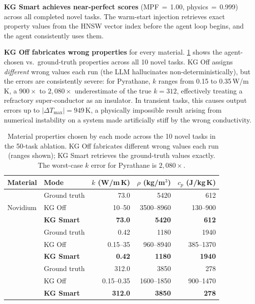 \documentclass[twocolumn]{article}
\begin{document}
\textbf{KG Smart achieves near-perfect scores} (MPF$\,{=}\,$1.00,
physics$\,{=}\,$0.999) across all completed novel tasks.  The warm-start
injection retrieves exact property values from the HNSW vector index
before the agent loop begins, and the agent consistently uses them.

\textbf{KG Off fabricates wrong properties} for every material.
\cref{tab:novel-props} shows the agent-chosen vs.\ ground-truth
properties across all 10 novel tasks.  KG Off assigns \emph{different}
wrong values each run (the LLM hallucinates non-deterministically), but
the errors are consistently severe: for Pyrathane, $k$ ranges from
0.15 to 0.35\,W/m\,K, a $900{\times}$ to $2{,}080{\times}$ underestimate
of the true $k{=}312$, effectively treating a refractory super-conductor
as an insulator.  In transient tasks, this causes output errors up to
$|\Delta T_{\max}|{=}949$\,K, a physically impossible result arising
from numerical instability on a system made artificially stiff by the
wrong conductivity.

\begin{table}[htbp]
\centering\footnotesize
\caption{Material properties chosen by each mode across the 10 novel tasks
  in the 50-task ablation.  KG Off fabricates different wrong values each
  run (ranges shown); KG Smart retrieves the ground-truth values exactly.
  The worst-case $k$ error for Pyrathane is $2{,}080\times$.}
\label{tab:novel-props}
\setlength{\tabcolsep}{3pt}
\begin{tabular}{llrrr}
\toprule
Material & Mode & $k$ (W/m\,K) & $\rho$ (kg/m$^3$) & $c_p$ (J/kg\,K) \\
\midrule
\multirow{3}{*}{Novidium}
  & Ground truth & 73.0 & 5420 & 612 \\
  & KG Off  & 10--50  & 3500--8960 & 130--900 \\
  & \textbf{KG Smart} & \textbf{73.0} & \textbf{5420} & \textbf{612} \\
\addlinespace
\multirow{3}{*}{Cryonite}
  & Ground truth & 0.42 & 1180 & 1940 \\
  & KG Off  & 0.15--35 & 960--8940 & 385--1370 \\
  & \textbf{KG Smart} & \textbf{0.42} & \textbf{1180} & \textbf{1940} \\
\addlinespace
\multirow{3}{*}{Pyrathane}
  & Ground truth & 312.0 & 3850 & 278 \\
  & KG Off  & 0.15--0.35  & 1600--1850 & 900--1470 \\
  & \textbf{KG Smart} & \textbf{312.0} & \textbf{3850} & \textbf{278} \\
\bottomrule
\end{tabular}
\end{table}
\end{document}
